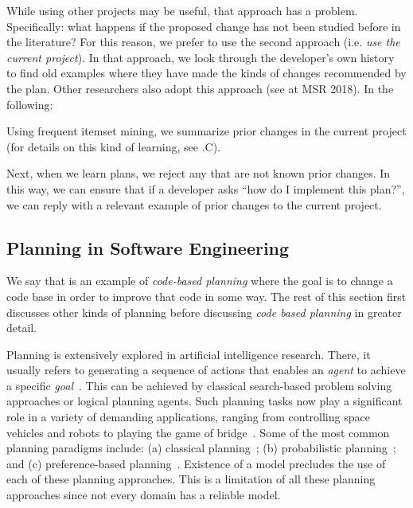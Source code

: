 While using other projects may be useful,
that approach has a problem. Specifically: 
what happens
 if the proposed change has not been studied before in the literature?
 For this reason,
 we prefer to use the second approach
 (i.e. {\em use the current project}).
 In that approach, we look through the developer's own history to find old examples where they have made the kinds of changes recommended by the plan. 
Other researchers also adopt this approach (see
\citep{nayrolles2018clever} at MSR 2018). In the following:
 \bi
 \item
Using frequent itemset  mining, we
   summarize prior  changes in the current
 project (for details on this kind of learning, see 
  .C).
 \item
Next, when we learn plans, we reject any
that are not known prior changes.
\ei
 In this way, we can ensure that if a developer asks ``how do I implement this plan?'',
 we can reply with a relevant
 example of prior changes to the current project.


\subsection{Planning in Software Engineering}
\label{sect:planners}

We say that  is an example of {\em code-based planning} where the goal is to change a code base in order to improve that code in some way. The rest of this section first discusses other kinds of planning before discussing \textit{code based planning} in greater detail.

Planning is extensively explored in artificial intelligence research. There, it usually refers to generating a sequence of actions that enables an \textit{agent} to achieve a specific \textit{goal}~\citep{norvig}. This can be achieved by classical search-based problem solving approaches or logical planning agents. Such planning tasks now play a significant role in a variety of demanding applications, ranging from controlling space vehicles and robots to playing the game of bridge~\citep{ghallab04}. Some of the most common planning paradigms include: (a) classical planning~\citep{wooldridge95}; (b) probabilistic planning~\citep{Bel, altman99, guo2009}; and (c) preference-based planning~\citep{son06, baier09}. Existence of a model precludes the use of each of these planning approaches. This is a limitation of all these planning approaches since not every domain has a reliable model. 

